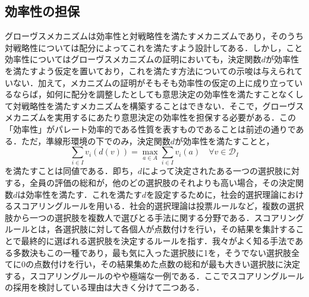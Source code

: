\documentclass[a4paper, 11pt]{jsarticle}
\begin{document}
\subsection{効率性の担保}
グローヴスメカニズムは効率性と対戦略性を満たすメカニズムであり，そのうち対戦略性については配分によってこれを満たすよう設計してある．しかし，こと効率性についてはグローヴスメカニズムの証明においても，決定関数\(d\)が効率性を満たすよう仮定を置いており，これを満たす方法についての示唆は与えられていない．加えて，メカニズムの証明がそもそも効率性の仮定の上に成り立っているならば，如何に配分を調整したとしても意思決定の効率性を満たすことなくして対戦略性を満たすメカニズムを構築することはできない．そこで，グローヴスメカニズムを実用するにあたり意思決定の効率性を担保する必要がある．この「効率性」がパレート効率的である性質を表すものであることは前述の通りである．ただ，準線形環境の下でのみ，決定関数\(d\)が効率性を満たすことと，
\begin{equation}
\label{efficiency}
\sum_{i \in I}v_i(d(v)) = \max_{a \in A}\sum_{i \in I}v_i(a) \quad \forall v \in \mathscr{D}_I
\end{equation}
を満たすことは同値である．即ち，\(d\)によって決定されたある一つの選択肢に対する，全員の評価の総和が，他のどの選択肢のそれよりも高い場合，その決定関数\(d\)は効率性を満たす．これを満たす\(d\)を設定するために，社会的選択理論におけるスコアリングルールを用いる．社会的選択理論は投票ルールなど，複数の選択肢から一つの選択肢を複数人で選びとる手法に関する分野である．スコアリングルールとは，各選択肢に対して各個人が点数付けを行い，その結果を集計することで最終的に選ばれる選択肢を決定するルールを指す．我々がよく知る手法である多数決もこの一種であり，最も気に入った選択肢に1を，そうでない選択肢全てに0の点数付けを行い，その結果集めた点数の総和が最も大きい選択肢に決定する，スコアリングルールのやや極端な一例である．ここでスコアリングルールの採用を検討している理由は大きく分けて二つある．
\end{document}
